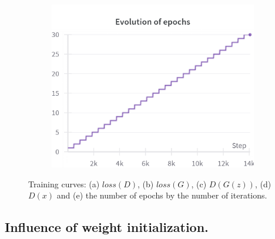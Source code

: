 \begin{figure}[H]
    \begin{subfigure}{0.45\textwidth}
        \centering
        \includegraphics[width=0.95\linewidth]{longer_epochs/epochs.png}
        \caption{}
        \label{subfig:longer_epochs/epochs}
    \end{subfigure}%

    \caption{Training curves: (a) $loss(D)$, (b) $loss(G)$, (c) $D(G(z))$, (d) $D(x)$ and (e) the number of epochs by the number of iterations.}
    \label{fig:longer_epochs_losses}
\end{figure}

\subsection{Influence of weight initialization.} \label{appendix:init}

